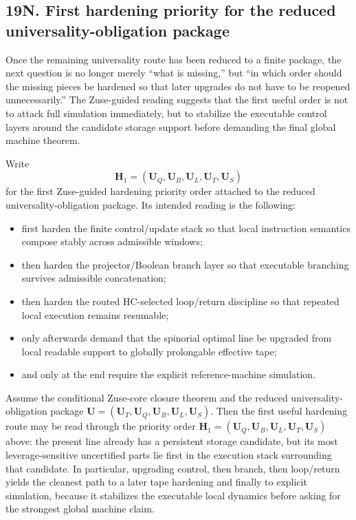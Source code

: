 \subsection*{19N. First hardening priority for the reduced universality-obligation package}
Once the remaining universality route has been reduced to a finite package, the next question is no longer merely ``what is missing,'' but ``in which order should the missing pieces be hardened so that later upgrades do not have to be reopened unnecessarily.'' The Zuse-guided reading suggests that the first useful order is not to attack full simulation immediately, but to stabilize the executable control layers around the candidate storage support before demanding the final global machine theorem.

\begin{definition}
Write
\[
\mathbf H_1=(\mathbf U_Q,\mathbf U_B,\mathbf U_L,\mathbf U_T,\mathbf U_S)
\]
for the first Zuse-guided hardening priority order attached to the reduced universality-obligation package. Its intended reading is the following:
\begin{itemize}[leftmargin=2em]
  \item first harden the finite control/update stack so that local instruction semantics compose stably across admissible windows;
  \item then harden the projector/Boolean branch layer so that executable branching survives admissible concatenation;
  \item then harden the routed HC-selected loop/return discipline so that repeated local execution remains resumable;
  \item only afterwards demand that the spinorial optimal line be upgraded from local readable support to globally prolongable effective tape;
  \item and only at the end require the explicit reference-machine simulation.
\end{itemize}
\end{definition}

\begin{proposition}
Assume the conditional Zuse-core closure theorem and the reduced universality-obligation package $\mathbf U=(\mathbf U_T,\mathbf U_Q,\mathbf U_B,\mathbf U_L,\mathbf U_S)$. Then the first useful hardening route may be read through the priority order $\mathbf H_1=(\mathbf U_Q,\mathbf U_B,\mathbf U_L,\mathbf U_T,\mathbf U_S)$ above: the present line already has a persistent storage candidate, but its most leverage-sensitive uncertified parts lie first in the execution stack surrounding that candidate. In particular, upgrading control, then branch, then loop/return yields the cleanest path to a later tape hardening and finally to explicit simulation, because it stabilizes the executable local dynamics before asking for the strongest global machine claim.
\end{proposition}

